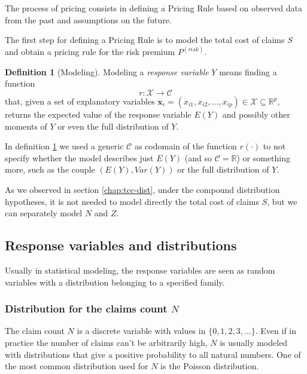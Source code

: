 \documentclass[a4paper, nobind]{templates/ociamthesis}
\theoremstyle{definition}
\newtheorem{definition}{Definition}[chapter]
\theoremstyle{definition}
\theoremstyle{definition}
\theoremstyle{remark}
\begin{document}
The process of pricing consists in defining a Pricing Rule based on observed data from the past and assumptions on the future.

The first step for defining a Pricing Rule is to model the total cost of claims \(S\) and obtain a pricing rule for the risk premium \(P^{(risk)}\).

\begin{definition}[Modeling]
\label{def:modeling} \iffalse (Modeling) \fi{} Modeling a \emph{response variable} \(Y\) means finding a function
\[r:\mathcal{X}\rightarrow \mathcal{C}\]
that, given a set of explanatory variables \(\boldsymbol{x}_i=(x_{i1}, x_{i2}, \dots, x_{ip})\in \mathcal{X} \subseteq \mathbb{R}^p\), returns the expected value of the response variable \(E(Y)\) and possibly other moments of \(Y\) or even the full distribution of \(Y\).
\end{definition}

In definition \ref{def:modeling} we used a generic \(\mathcal{C}\) as codomain of the function \(r(\cdot)\) to not specify whether the model describes just \(E(Y)\) (and so \(\mathcal{C}=\mathbb{R}\)) or something more, such as the couple \(\left( E(Y), Var(Y) \right)\) or the full distribution of \(Y\).

As we observed in section \ref{chap:tcc-dist}, under the compound distribution hypotheses, it is not needed to model directly the total cost of claims \(S\), but we can separately model \(N\) and \(Z\).

\hypertarget{response-variables-and-distributions}{%
\subsection{Response variables and distributions}\label{response-variables-and-distributions}}

Usually in statistical modeling, the response variables are seen as random variables with a distribution belonging to a specified family.

\hypertarget{chap:dist-n}{%
\subsubsection{\texorpdfstring{Distribution for the claims count \(N\)}{Distribution for the claims count N}}\label{chap:dist-n}}

The claim count \(N\) is a discrete variable with values in \(\{0, 1, 2, 3,\dots\}\). Even if in practice the number of claims can't be arbitrarily high, \(N\) is usually modeled with distributions that give a positive probability to all natural numbers. One of the most common distribution used for \(N\) is the Poisson distribution.
\end{document}
